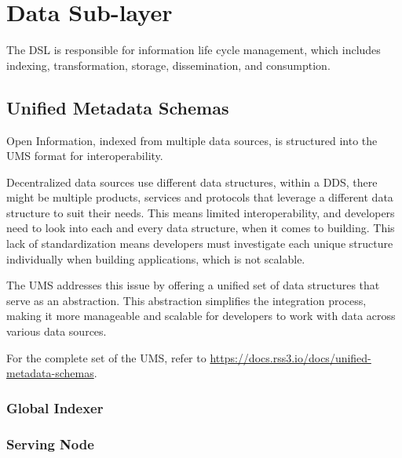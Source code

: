 \section{Data Sub-layer}

The \gls{DSL} is responsible for information life cycle management, which includes indexing, transformation, storage, dissemination, and consumption.

\subsection{Unified Metadata Schemas}

Open Information, indexed from multiple data sources, is structured into the \gls{UMS} format for interoperability.

Decentralized data sources use different data structures, within a DDS, there might be multiple products, services and protocols that leverage a different data structure to suit their needs. This means limited interoperability, and developers need to look into each and every data structure, when it comes to building. This lack of standardization means developers must investigate each unique structure individually when building applications, which is not scalable.

The UMS addresses this issue by offering a unified set of data structures that serve as an abstraction. This abstraction simplifies the integration process, making it more manageable and scalable for developers to work with data across various data sources.

For the complete set of the \gls{UMS}, refer to \url{https://docs.rss3.io/docs/unified-metadata-schemas}.


\subsubsection{Global Indexer}

\subsubsection{Serving Node}
